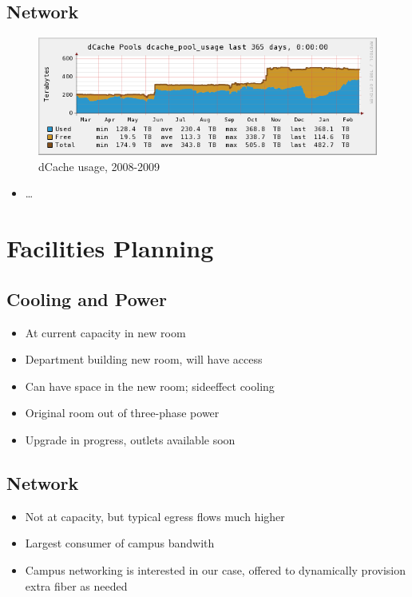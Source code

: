 \documentclass{beamer}
\begin{document}
\subsection{Network}
\begin{frame}
\begin{figure}
    \includegraphics[width=\textwidth]{Graphics/dcache-usage-1yr.png}
    \caption{dCache usage, 2008-2009}
\end{figure}

\begin{itemize}
    \item \ldots{}
\end{itemize}
\end{frame}

\section{Facilities Planning}
\subsection{Cooling and Power}
\begin{frame}
\begin{itemize}
    \item At current capacity in new room
    \item Department building new room, will have access
    \item Can have space in the new room; sideeffect cooling
    \item Original room out of three-phase power
    \item Upgrade in progress, outlets available soon
\end{itemize}
\end{frame}

\subsection{Network}
\begin{frame}
\begin{itemize}
    \item Not at capacity, but typical egress flows much higher
    \item Largest consumer of campus bandwith
    \item Campus networking is interested in our case, offered to dynamically provision extra fiber as needed
\end{itemize}
\end{frame}
\end{document}

